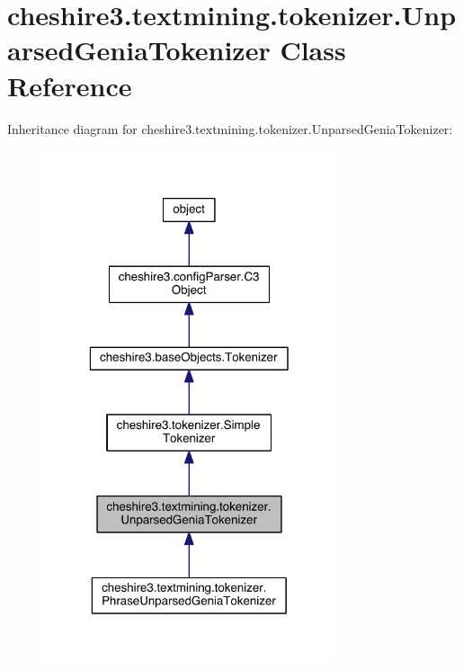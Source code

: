 \hypertarget{classcheshire3_1_1textmining_1_1tokenizer_1_1_unparsed_genia_tokenizer}{\section{cheshire3.\-textmining.\-tokenizer.\-Unparsed\-Genia\-Tokenizer Class Reference}
\label{classcheshire3_1_1textmining_1_1tokenizer_1_1_unparsed_genia_tokenizer}
}


Inheritance diagram for cheshire3.\-textmining.\-tokenizer.\-Unparsed\-Genia\-Tokenizer\-:
\nopagebreak
\begin{figure}[H]
\begin{center}
\leavevmode
\includegraphics[width=244pt]{classcheshire3_1_1textmining_1_1tokenizer_1_1_unparsed_genia_tokenizer__inherit__graph}
\end{center}
\end{figure}



